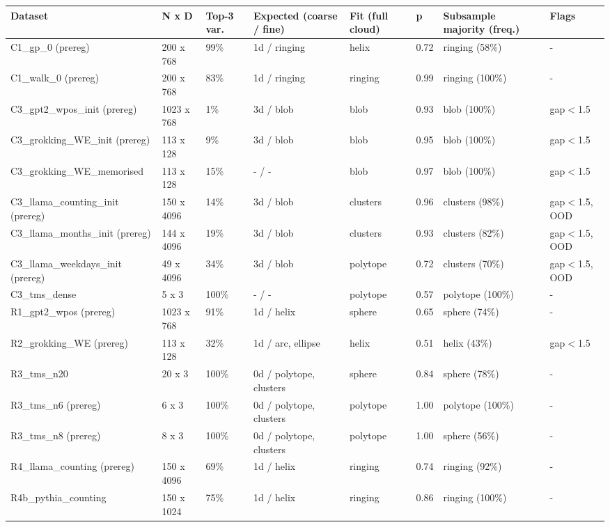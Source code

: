 \scriptsize
\begin{tabular}{llllllll}
\toprule
\textbf{Dataset} & \textbf{N x D} & \textbf{Top-3 var.} & \textbf{Expected (coarse / fine)} & \textbf{Fit (full cloud)} & \textbf{p} & \textbf{Subsample majority (freq.)} & \textbf{Flags} \\
\midrule
C1\_gp\_0 (prereg) & 200 x 768 & 99\% & 1d / ringing & helix & 0.72 & ringing (58\%) & - \\
C1\_walk\_0 (prereg) & 200 x 768 & 83\% & 1d / ringing & ringing & 0.99 & ringing (100\%) & - \\
C3\_gpt2\_wpos\_init (prereg) & 1023 x 768 & 1\% & 3d / blob & blob & 0.93 & blob (100\%) & gap$<$1.5 \\
C3\_grokking\_WE\_init (prereg) & 113 x 128 & 9\% & 3d / blob & blob & 0.95 & blob (100\%) & gap$<$1.5 \\
C3\_grokking\_WE\_memorised & 113 x 128 & 15\% & - / - & blob & 0.97 & blob (100\%) & gap$<$1.5 \\
C3\_llama\_counting\_init (prereg) & 150 x 4096 & 14\% & 3d / blob & clusters & 0.96 & clusters (98\%) & gap$<$1.5, OOD \\
C3\_llama\_months\_init (prereg) & 144 x 4096 & 19\% & 3d / blob & clusters & 0.93 & clusters (82\%) & gap$<$1.5, OOD \\
C3\_llama\_weekdays\_init (prereg) & 49 x 4096 & 34\% & 3d / blob & polytope & 0.72 & clusters (70\%) & gap$<$1.5, OOD \\
C3\_tms\_dense & 5 x 3 & 100\% & - / - & polytope & 0.57 & polytope (100\%) & - \\
R1\_gpt2\_wpos (prereg) & 1023 x 768 & 91\% & 1d / helix & sphere & 0.65 & sphere (74\%) & - \\
R2\_grokking\_WE (prereg) & 113 x 128 & 32\% & 1d / arc, ellipse & helix & 0.51 & helix (43\%) & gap$<$1.5 \\
R3\_tms\_n20 & 20 x 3 & 100\% & 0d / polytope, clusters & sphere & 0.84 & sphere (78\%) & - \\
R3\_tms\_n6 (prereg) & 6 x 3 & 100\% & 0d / polytope, clusters & polytope & 1.00 & polytope (100\%) & - \\
R3\_tms\_n8 (prereg) & 8 x 3 & 100\% & 0d / polytope, clusters & polytope & 1.00 & sphere (56\%) & - \\
R4\_llama\_counting (prereg) & 150 x 4096 & 69\% & 1d / helix & ringing & 0.74 & ringing (92\%) & - \\
R4b\_pythia\_counting & 150 x 1024 & 75\% & 1d / helix & ringing & 0.86 & ringing (100\%) & - \\

\end{tabular}
